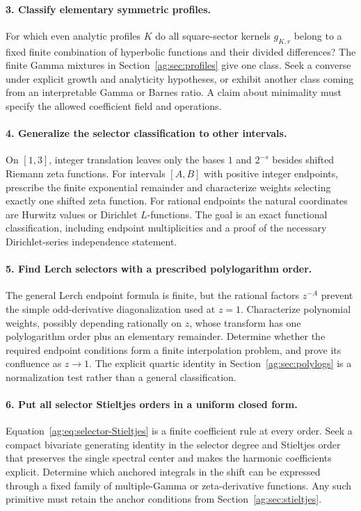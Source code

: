 \documentclass[11pt,letterpaper]{article}
\numberwithin{equation}{section}
\theoremstyle{definition}\newtheorem{definition}[theorem]{Definition}
\theoremstyle{remark}\newtheorem{remark}[theorem]{Remark}
\begin{document}
\paragraph{3. Classify elementary symmetric profiles.}
For which even analytic profiles $K$ do all square-sector kernels
$g_{K,r}$ belong to a fixed finite combination of hyperbolic functions
and their divided differences? The finite Gamma mixtures in
Section~\ref{ag:sec:profiles} give one class. Seek a converse under
explicit growth and analyticity hypotheses, or exhibit another class
coming from an interpretable Gamma or Barnes ratio. A claim about
minimality must specify the allowed coefficient field and operations.

\paragraph{4. Generalize the selector classification to other intervals.}
On $[1,3]$, integer translation leaves only the bases $1$ and $2^{-s}$
besides shifted Riemann zeta functions. For intervals $[A,B]$ with
positive integer endpoints, prescribe the finite exponential remainder
and characterize weights selecting exactly one shifted zeta function.
For rational endpoints the natural coordinates are Hurwitz values or
Dirichlet $L$-functions. The goal is an exact functional classification,
including endpoint multiplicities and a proof of the necessary
Dirichlet-series independence statement.

\paragraph{5. Find Lerch selectors with a prescribed polylogarithm order.}
The general Lerch endpoint formula is finite, but the rational factors
$z^{-A}$ prevent the simple odd-derivative diagonalization used at $z=1$.
Characterize polynomial weights, possibly depending rationally on $z$,
whose transform has one polylogarithm order plus an elementary
remainder. Determine whether the required endpoint conditions form a
finite interpolation problem, and prove its confluence as $z\to1$.
The explicit quartic identity in Section~\ref{ag:sec:polylogs} is a
normalization test rather than a general classification.

\paragraph{6. Put all selector Stieltjes orders in a uniform closed form.}
Equation~\eqref{ag:eq:selector-Stieltjes} is a finite coefficient rule
at every order. Seek a compact bivariate generating identity in the
selector degree and Stieltjes order that preserves the single spectral
center and makes the harmonic coefficients explicit. Determine which
anchored integrals in the shift can be expressed through a fixed family
of multiple-Gamma or zeta-derivative functions. Any such primitive must
retain the anchor conditions from Section~\ref{ag:sec:stieltjes}.
\end{document}
